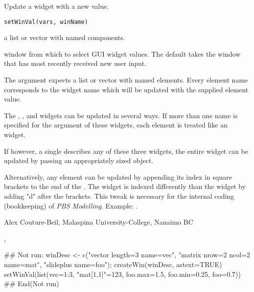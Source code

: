 \documentclass[letterpaper]{book}
\begin{document}
\begin{Description}\relax
Update a widget with a new value.
\end{Description}
\begin{Usage}
\begin{verbatim}
setWinVal(vars, winName)
\end{verbatim}
\end{Usage}
\begin{Arguments}
\begin{ldescription}
\item[\code{vars}] a list or vector with named components.
\item[\code{winName}] window from which to select GUI widget values. The default 
takes the window that has most recently received new user input.
\end{ldescription}
\end{Arguments}
\begin{Details}\relax
The  argument expects a list or vector with named elements. 
Every element name corresponds to the widget name which will be updated 
with the supplied element value.

The , , and  widgets can be updated in 
several ways. If more than one name is specified for the  argument 
of these widgets, each element is treated like an  widget. 

If however, a single  describes any of these three widgets, the entire 
widget can be updated by passing an appropriately sized object.

Alternatively, any element can be updated by appending its index in square brackets 
to the end of the . The  widget is indexed differently 
than the  widget by adding "d" after the brackets. This tweak is necessary 
for the internal coding (bookkeeping) of \emph{PBS Modelling}. Example: .
\end{Details}
\begin{Author}\relax
Alex Couture-Beil, Malaspina University-College, Nanaimo BC
\end{Author}
\begin{SeeAlso}\relax
{}, 
\end{SeeAlso}
\begin{Examples}
\begin{ExampleCode}
## Not run: 
winDesc <- c("vector length=3 name=vec",
             "matrix nrow=2 ncol=2 name=mat",
             "slideplus name=foo");
createWin(winDesc, astext=TRUE)
setWinVal(list(vec=1:3, "mat[1,1]"=123, foo.max=1.5, foo.min=0.25, foo=0.7))
## End(Not run)
\end{ExampleCode}
\end{Examples}
\end{document}
